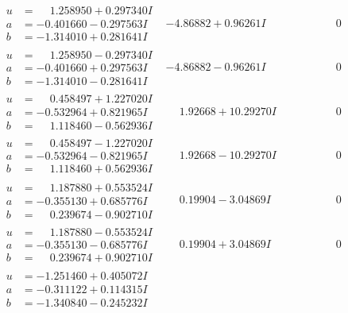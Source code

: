 \documentclass[1p]{elsarticle_modified}
\theoremstyle{definition}
\begin{document}
$$\begin{array}{c|c|c}
\begin{aligned}
u &= \phantom{-}1.258950 + 0.297340 I \\
a &= -0.401660 - 0.297563 I \\
b &= -1.314010 + 0.281641 I\end{aligned}
 & -4.86882 + 0.96261 I & \phantom{-0.000000 } 0 \\ \hline\begin{aligned}
u &= \phantom{-}1.258950 - 0.297340 I \\
a &= -0.401660 + 0.297563 I \\
b &= -1.314010 - 0.281641 I\end{aligned}
 & -4.86882 - 0.96261 I & \phantom{-0.000000 } 0 \\ \hline\begin{aligned}
u &= \phantom{-}0.458497 + 1.227020 I \\
a &= -0.532964 + 0.821965 I \\
b &= \phantom{-}1.118460 - 0.562936 I\end{aligned}
 & \phantom{-}1.92668 + 10.29270 I & \phantom{-0.000000 } 0 \\ \hline\begin{aligned}
u &= \phantom{-}0.458497 - 1.227020 I \\
a &= -0.532964 - 0.821965 I \\
b &= \phantom{-}1.118460 + 0.562936 I\end{aligned}
 & \phantom{-}1.92668 - 10.29270 I & \phantom{-0.000000 } 0 \\ \hline\begin{aligned}
u &= \phantom{-}1.187880 + 0.553524 I \\
a &= -0.355130 + 0.685776 I \\
b &= \phantom{-}0.239674 - 0.902710 I\end{aligned}
 & \phantom{-}0.19904 - 3.04869 I & \phantom{-0.000000 } 0 \\ \hline\begin{aligned}
u &= \phantom{-}1.187880 - 0.553524 I \\
a &= -0.355130 - 0.685776 I \\
b &= \phantom{-}0.239674 + 0.902710 I\end{aligned}
 & \phantom{-}0.19904 + 3.04869 I & \phantom{-0.000000 } 0 \\ \hline\begin{aligned}
u &= -1.251460 + 0.405072 I \\
a &= -0.311122 + 0.114315 I \\
b &= -1.340840 - 0.245232 I\end{aligned}

\end{array}$$
\end{document}
